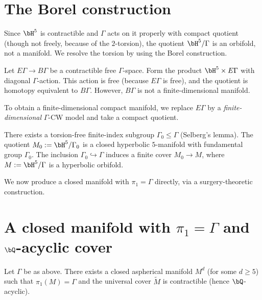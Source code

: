 \section{The Borel construction}

Since $\bH^5$ is contractible and $\Gamma$ acts on it properly with compact quotient (though not freely, because of the $2$-torsion), the quotient $\bH^5/\Gamma$ is an orbifold, not a manifold. We resolve the torsion by using the Borel construction.

Let $E\Gamma\to B\Gamma$ be a contractible free $\Gamma$-space. Form the product $\bH^5\times E\Gamma$ with diagonal $\Gamma$-action. This action is free (because $E\Gamma$ is free), and the quotient is homotopy equivalent to $B\Gamma$. However, $B\Gamma$ is not a finite-dimensional manifold.

To obtain a finite-dimensional compact manifold, we replace $E\Gamma$ by a \emph{finite-dimensional} $\Gamma$-CW model and take a compact quotient.

\begin{theorem}\label{thm:smoothing}
There exists a torsion-free finite-index subgroup $\Gamma_0\leq \Gamma$ (Selberg's lemma). The quotient $M_0 := \bH^5/\Gamma_0$ is a closed hyperbolic $5$-manifold with fundamental group $\Gamma_0$. The inclusion $\Gamma_0\hookrightarrow \Gamma$ induces a finite cover $M_0\to M$, where $M:=\bH^5/\Gamma$ is a hyperbolic orbifold.
\end{theorem}

We now produce a closed manifold with $\pi_1 = \Gamma$ directly, via a surgery-theoretic construction.

\section{A closed manifold with $\pi_1 = \Gamma$ and $\bQ$-acyclic cover}

\begin{theorem}\label{thm:main}
Let $\Gamma$ be as above. There exists a closed aspherical manifold $M^d$ (for some $d\geq 5$) such that $\pi_1(M) = \Gamma$ and the universal cover $\widetilde M$ is contractible (hence $\bQ$-acyclic).
\end{theorem}


